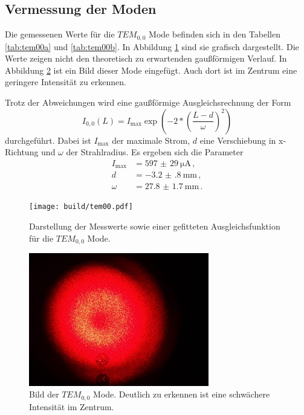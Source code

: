 \subsection{Vermessung der Moden}
\label{subsec:moden}

Die gemessenen Werte für die $TEM_{0,0}$ Mode befinden sich in den Tabellen \ref{tab:tem00a} und \ref{tab:tem00b}. In Abbildung \ref{fig:tem00} sind sie
grafisch dargestellt. Die Werte zeigen nicht den theoretisch zu erwartenden gaußförmigen
Verlauf. In Abbildung \ref{fig:bild} ist ein Bild dieser Mode eingefügt. Auch dort
ist im Zentrum eine geringere Intensität zu erkennen.

Trotz der Abweichungen wird eine gaußförmige Ausgleichsrechnung der Form
\begin{equation*}
  I_{0,0}(L)=I_{\text{max}} \exp\left(-2*\left(\frac{L-d}{\omega}\right)^2\right)
\end{equation*}
durchgeführt. Dabei ist $I_{\text{max}}$ der maximale Strom, $d$ eine Verschiebung in
x-Richtung und $\omega$ der Strahlradius.  Es ergeben sich die Parameter
\begin{align*}
  I_{\text{max}}&=\SI{597(29)}{\micro\ampere} \,,\\
  d&= \SI{-3.2(8)}{\milli\metre} \,, \\
  \omega&=\SI{27.8(17)}{\milli\metre} \,.
\end{align*}

\begin{figure}
  \centering
  \texttt{[image: build/tem00.pdf]}
  \caption{Darstellung der Messwerte sowie einer gefitteten Ausgleichsfunktion für die $TEM_{0,0}$ Mode.}
  \label{fig:tem00}
\end{figure}

\begin{figure}
  \centering
  \includegraphics[width=0.7\textwidth]{data/tem00.png}
  \caption{Bild der $TEM_{0,0}$ Mode. Deutlich zu erkennen ist eine schwächere Intensität im Zentrum.}
  \label{fig:bild}
\end{figure}



